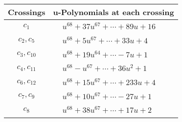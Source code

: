 \documentclass[1p]{elsarticle_modified}
\theoremstyle{definition}
\begin{document}
\begin{tabular}{m{50pt}|m{274pt}}
Crossings & \hspace{64pt}u-Polynomials at each crossing \\
\hline $$\begin{aligned}c_{1}\end{aligned}$$&$\begin{aligned}
&u^{68}+37 u^{67}+\cdots+89 u+16
\end{aligned}$\\
\hline $$\begin{aligned}c_{2},c_{5}\end{aligned}$$&$\begin{aligned}
&u^{68}+5 u^{67}+\cdots+33 u+4
\end{aligned}$\\
\hline $$\begin{aligned}c_{3},c_{10}\end{aligned}$$&$\begin{aligned}
&u^{68}+19 u^{64}+\cdots-7 u+1
\end{aligned}$\\
\hline $$\begin{aligned}c_{4},c_{11}\end{aligned}$$&$\begin{aligned}
&u^{68}- u^{67}+\cdots+36 u^2+1
\end{aligned}$\\
\hline $$\begin{aligned}c_{6},c_{12}\end{aligned}$$&$\begin{aligned}
&u^{68}+15 u^{67}+\cdots+233 u+4
\end{aligned}$\\
\hline $$\begin{aligned}c_{7},c_{9}\end{aligned}$$&$\begin{aligned}
&u^{68}+10 u^{67}+\cdots-27 u+1
\end{aligned}$\\
\hline $$\begin{aligned}c_{8}\end{aligned}$$&$\begin{aligned}
&u^{68}+38 u^{67}+\cdots+17 u+2
\end{aligned}$\\
\hline
\end{tabular}\\~\\
\newpage\renewcommand{\arraystretch}{1}
\end{document}
